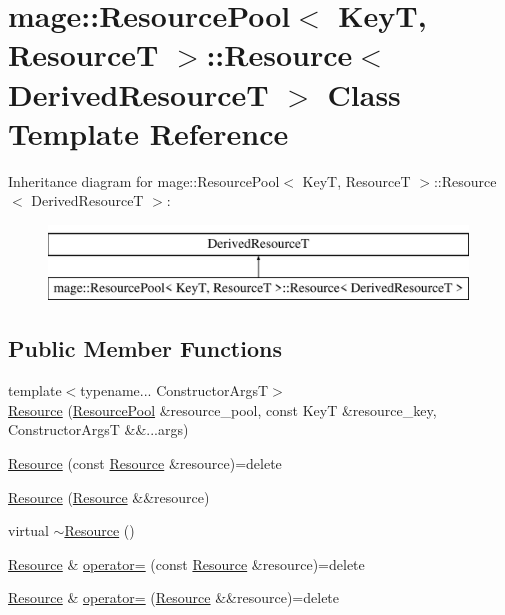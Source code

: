 \hypertarget{classmage_1_1_resource_pool_1_1_resource}{}\section{mage\+:\+:Resource\+Pool$<$ KeyT, ResourceT $>$\+:\+:Resource$<$ Derived\+ResourceT $>$ Class Template Reference}
\label{classmage_1_1_resource_pool_1_1_resource}
Inheritance diagram for mage\+:\+:Resource\+Pool$<$ KeyT, ResourceT $>$\+:\+:Resource$<$ Derived\+ResourceT $>$\+:\begin{figure}[H]
\begin{center}
\leavevmode
\includegraphics[height=2.000000cm]{classmage_1_1_resource_pool_1_1_resource}
\end{center}
\end{figure}
\subsection*{Public Member Functions}
\begin{DoxyCompactItemize}
\item 
{\footnotesize template$<$typename... Constructor\+ArgsT$>$ }\\\hyperlink{classmage_1_1_resource_pool_1_1_resource_ab02c587d973bc5b400d9708a06c327c4}{Resource} (\hyperlink{classmage_1_1_resource_pool}{Resource\+Pool} \&resource\+\_\+pool, const KeyT \&resource\+\_\+key, Constructor\+ArgsT \&\&...args)
\item 
\hyperlink{classmage_1_1_resource_pool_1_1_resource_a783237133052c9e41b4c2d02fcdeefec}{Resource} (const \hyperlink{classmage_1_1_resource_pool_1_1_resource}{Resource} \&resource)=delete
\item 
\hyperlink{classmage_1_1_resource_pool_1_1_resource_a1c8016d99e1496da9383cbc4f727a913}{Resource} (\hyperlink{classmage_1_1_resource_pool_1_1_resource}{Resource} \&\&resource)
\item 
virtual \hyperlink{classmage_1_1_resource_pool_1_1_resource_a1d8bd565ab8769cedd94c1a42c6ebf46}{$\sim$\+Resource} ()
\item 
\hyperlink{classmage_1_1_resource_pool_1_1_resource}{Resource} \& \hyperlink{classmage_1_1_resource_pool_1_1_resource_a9c619f220b0fa676111cd24cb575dbff}{operator=} (const \hyperlink{classmage_1_1_resource_pool_1_1_resource}{Resource} \&resource)=delete
\item 
\hyperlink{classmage_1_1_resource_pool_1_1_resource}{Resource} \& \hyperlink{classmage_1_1_resource_pool_1_1_resource_a56f04f53400e77ddcc3c26fad1342e31}{operator=} (\hyperlink{classmage_1_1_resource_pool_1_1_resource}{Resource} \&\&resource)=delete
\end{DoxyCompactItemize}
